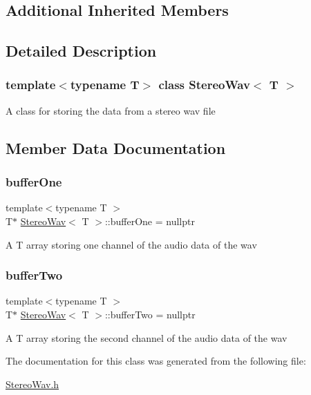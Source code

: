 \subsection*{Additional Inherited Members}


\subsection{Detailed Description}
\subsubsection*{template$<$typename T$>$\newline
class Stereo\+Wav$<$ T $>$}

A class for storing the data from a stereo wav file 

\subsection{Member Data Documentation}
\mbox{\label{classStereoWav_a6d66822cb86640adf89bf62fcbbeb563}} 
\subsubsection{\texorpdfstring{buffer\+One}{bufferOne}}
{\footnotesize\ttfamily template$<$typename T $>$ \\
T$\ast$ \hyperlink{classStereoWav}{Stereo\+Wav}$<$ T $>$\+::buffer\+One = nullptr\hspace{0.3cm}{\ttfamily [private]}}

A T array storing one channel of the audio data of the wav \mbox{\label{classStereoWav_a8235e3a3cc12840a549f2de9d74de35e}} 
\subsubsection{\texorpdfstring{buffer\+Two}{bufferTwo}}
{\footnotesize\ttfamily template$<$typename T $>$ \\
T$\ast$ \hyperlink{classStereoWav}{Stereo\+Wav}$<$ T $>$\+::buffer\+Two = nullptr\hspace{0.3cm}{\ttfamily [private]}}

A T array storing the second channel of the audio data of the wav 

The documentation for this class was generated from the following file\+:\begin{DoxyCompactItemize}
\item 
\hyperlink{StereoWav_8h}{Stereo\+Wav.\+h}\end{DoxyCompactItemize}
